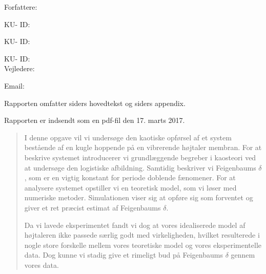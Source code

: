 \documentclass[12pt,oneside,a4paper]{article}
\numberwithin{equation}{section}
\begin{document}
\vfill
{\large Forfattere:}\\
{\large \hspace*{1cm}   \hspace{1cm} KU- ID:  \\
{\large \hspace*{1cm}    \hspace{1cm} KU- ID:  \\
{\large \hspace*{1cm}    \hspace{1cm} KU- ID:  \\

{\large Vejledere:}\\
{\large \hspace*{1cm}   \hspace{1cm} Email:  \\

\vfill

{\large Rapporten omfatter {\bf {}} siders 
hovedtekst og 
{\bf 
{}} siders appendix.}

{\large Rapporten er indsendt som en pdf-fil den 17. marts 2017. }

\normalsize


\newpage
{}
\begin{abstract}
\setlength{\parindent}{0cm}
\setlength{\parskip}{0.3cm}
\noindent I denne opgave vil vi undersøge den kaotiske opførsel af et system 
bestående af en  kugle hoppende på en vibrerende højtaler membran. For at 
beskrive systemet introducerer vi grundlæggende begreber i kaosteori ved at 
undersøge den logistiske afbildning. Samtidig beskriver vi Feigenbaums 
$\delta$, som er en vigtig konstant for periode doblende fænomener. For at 
analysere systemet opstiller vi en teoretisk model, som vi løser med numeriske 
metoder. Simulationen viser sig at opføre sig som forventet og giver et ret 
præcist estimat af Feigenbaums $\delta$.

Da vi lavede eksperimentet fandt vi dog at vores idealiserede model af højtaleren ikke passede særlig godt med virkeligheden, hvilket resulterede i nogle store forskelle mellem vores teoretiske model og vores eksperimentelle data. Dog kunne vi stadig give et rimeligt bud på Feigenbaums $\delta$ gennem vores data.



\end{abstract}}}}}
\end{document}
